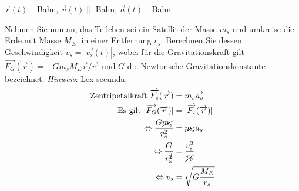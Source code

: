\begin{enumeralph}
\begin{enumeroman}
			$\overrightarrow{r}(t)\bot$ Bahn, $\overrightarrow{v}(t)\parallel$ Bahn, $\overrightarrow{a}(t)\bot$ Bahn
			\item Nehmen Sie nun an, das Teilchen sei ein Satellit der Masse $m_s$ und umkreise die Erde,mit Masse $M_E$, in einer Entfernung $r_s$.  Berechnen Sie dessen Geschwindigkeit $v_s=|\overrightarrow{v_s}(t)|$, wobei für die Gravitationskraft gilt $\overrightarrow{F_G}(\overrightarrow{r}) =-Gm_sM_E\overrightarrow{r}/r^3$ und $G$ die Newtonsche Gravitationskonstante bezeichnet. \textit{Hinweis}: Lex secunda.\\
			\begin{align*}
			\text{Zentripetalkraft } \overrightarrow{F_z}(\overrightarrow{r})&=m_s\overrightarrow{a_s}\\
			\text{Es gilt } |\overrightarrow{F_G}(\overrightarrow{r})| &= | \overrightarrow{F_z}(\overrightarrow{r})|\\
			\Leftrightarrow \frac{G\cancel{m_s}}{r_s^2}&=\cancel{m_s}a_s\\
			\Leftrightarrow \frac{G}{r_s^{\cancel{2}}}&=\frac{v_s^2}{\cancel{r_s}}\\
			\Leftrightarrow v_s &= \sqrt{G\frac{M_E}{r_s}}
			\end{align*}
		\end{enumeroman}
	\end{enumeralph}

